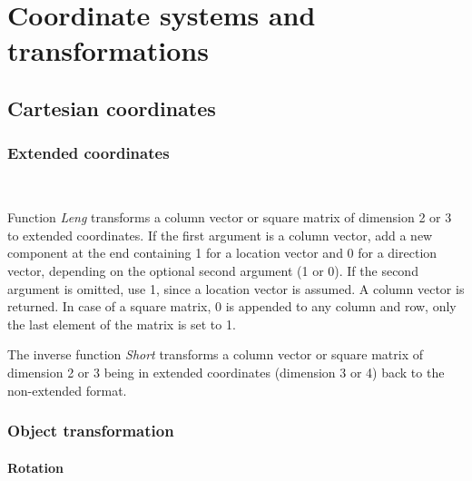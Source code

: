 \documentclass[../Maxima_Workbook.tex]{subfiles}
\begin{document}
	
\chapter{Coordinate systems and transformations}

\section{Cartesian coordinates}

\subsection{Extended coordinates}

\lz {} \hfill {} \\
 \hfill {}

\lz Function \emph{Leng} transforms a column vector or square matrix of dimension 2 or 3 to extended coordinates. If the first argument is a column vector, add a new component at the end containing 1 for a location vector and 0 for a direction vector, depending on the optional second argument (1 or 0). If the second argument is omitted, use 1, since a location vector is assumed. A column vector is returned. In case of a square matrix, 0 is appended to any column and row, only the last element of the matrix is set to 1.

\lz The inverse function \emph{Short} transforms a column vector or square matrix of dimension 2 or 3 being in extended coordinates (dimension 3 or 4) back to the non-extended format.

\subsection{Object transformation}

\subsubsection{Rotation}

\lz {} \hfill {}
\end{document}
